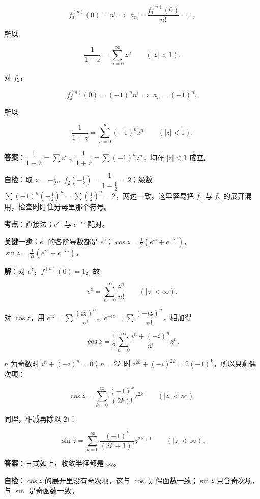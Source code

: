\documentclass[11pt]{ctexart}
\renewcommand{\qbreak}{\needspace{0.45\textheight}}
\begin{document}
\[ f_1^{(n)}(0)=n!\ \Longrightarrow\ a_n=\frac{f_1^{(n)}(0)}{n!}=1 , \]

所以

\[ \frac{1}{1-z}=\sum_{n=0}^{\infty}z^n\qquad(|z|<1) . \]

对 $f_2$，

\[ f_2^{(n)}(0)=(-1)^n n!\ \Longrightarrow\ a_n=(-1)^n , \]

所以

\[ \frac{1}{1+z}=\sum_{n=0}^{\infty}(-1)^n z^n\qquad(|z|<1) . \]

\textbf{答案}：$\dfrac{1}{1-z}=\sum z^n$，$\dfrac{1}{1+z}=\sum(-1)^n z^n$，均在 $|z|<1$ 成立。

\textbf{自检}：取 $z=-\tfrac12$。$f_2(-\tfrac12)=\dfrac{1}{1-\tfrac12}=2$；级数 $\sum(-1)^n\left(-\tfrac12\right)^n=\sum\left(\tfrac12\right)^n=2$，两边一致。这里容易把 $f_1$ 与 $f_2$ 的展开混用，检查时盯住分母里那个符号。

\qbreak
{}

\textbf{考点}：直接法；$e^{iz}$ 与 $e^{-iz}$ 配对。

\textbf{关键一步}：$e^z$ 的各阶导数都是 $e^z$；$\cos z=\tfrac12(e^{iz}+e^{-iz})$，$\sin z=\tfrac1{2i}(e^{iz}-e^{-iz})$。

\textbf{解}：对 $e^z$，$f^{(n)}(0)=1$，故

\[ e^z=\sum_{n=0}^{\infty}\frac{z^n}{n!}\qquad(|z|<\infty) . \]

对 $\cos z$，用 $e^{iz}=\sum\dfrac{(iz)^n}{n!}$、$e^{-iz}=\sum\dfrac{(-iz)^n}{n!}$，相加得

\[ \cos z=\frac12\sum_{n=0}^{\infty}\frac{i^n+(-i)^n}{n!}z^n . \]

$n$ 为奇数时 $i^n+(-i)^n=0$；$n=2k$ 时 $i^{2k}+(-i)^{2k}=2(-1)^k$。所以只剩偶次项：

\[ \cos z=\sum_{k=0}^{\infty}\frac{(-1)^k}{(2k)!}z^{2k}\qquad(|z|<\infty) . \]

同理，相减再除以 $2i$：

\[ \sin z=\sum_{k=0}^{\infty}\frac{(-1)^k}{(2k+1)!}z^{2k+1}\qquad(|z|<\infty) . \]

\textbf{答案}：三式如上，收敛半径都是 $\infty$。

\textbf{自检}：$\cos z$ 的展开里没有奇次项，这与 $\cos$ 是偶函数一致；$\sin z$ 只含奇次项，与 $\sin$ 是奇函数一致。

\qbreak
{}
\end{document}
